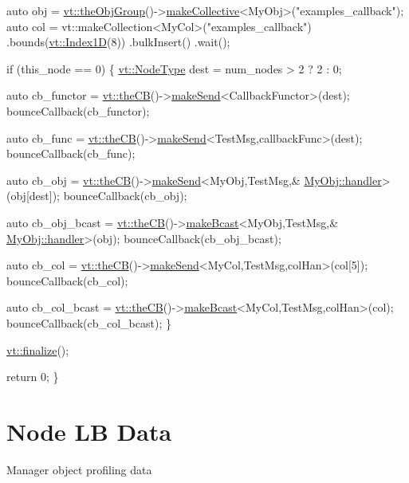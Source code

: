 \begin{DoxyCodeInclude}
  \textcolor{keyword}{auto} obj = \hyperlink{namespacevt_a833f0115b692f578167cbd88e30d39c5}{vt::theObjGroup}()->\hyperlink{structvt_1_1objgroup_1_1_obj_group_manager_a50e0d8498d142a05773ed5a046803b2b}{makeCollective}<MyObj>(\textcolor{stringliteral}{"examples\_callback"});
  \textcolor{keyword}{auto} col = vt::makeCollection<MyCol>(\textcolor{stringliteral}{"examples\_callback"})
    .bounds(\hyperlink{structvt_1_1index_1_1_dense_index_array}{vt::Index1D}(8))
    .bulkInsert()
    .wait();

  \textcolor{keywordflow}{if} (this\_node == 0) \{
    \hyperlink{namespacevt_a866da9d0efc19c0a1ce79e9e492f47e2}{vt::NodeType} dest = num\_nodes > 2 ? 2 : 0;

    \textcolor{keyword}{auto} cb\_functor = \hyperlink{namespacevt_a673b109e94c7bca58313504c83e1da94}{vt::theCB}()->\hyperlink{structvt_1_1pipe_1_1_pipe_manager_a73583be6260418b13ee66e56cdade2da}{makeSend}<CallbackFunctor>(dest);
    bounceCallback(cb\_functor);

    \textcolor{keyword}{auto} cb\_func = \hyperlink{namespacevt_a673b109e94c7bca58313504c83e1da94}{vt::theCB}()->\hyperlink{structvt_1_1pipe_1_1_pipe_manager_a73583be6260418b13ee66e56cdade2da}{makeSend}<TestMsg,callbackFunc>(dest);
    bounceCallback(cb\_func);

    \textcolor{keyword}{auto} cb\_obj = \hyperlink{namespacevt_a673b109e94c7bca58313504c83e1da94}{vt::theCB}()->\hyperlink{structvt_1_1pipe_1_1_pipe_manager_a73583be6260418b13ee66e56cdade2da}{makeSend}<MyObj,TestMsg,&
      \hyperlink{namespacevt_1_1config_a6bd1d6215bda0d8ca02811798399f689a82a0081a94d5c5dfd18b0b3f7eca64b7}{MyObj::handler}>(obj[dest]);
    bounceCallback(cb\_obj);

    \textcolor{keyword}{auto} cb\_obj\_bcast = \hyperlink{namespacevt_a673b109e94c7bca58313504c83e1da94}{vt::theCB}()->\hyperlink{structvt_1_1pipe_1_1_pipe_manager_a2ea6bd5ea3e001662681b1e5a1971e9d}{makeBcast}<MyObj,TestMsg,&
      \hyperlink{namespacevt_1_1config_a6bd1d6215bda0d8ca02811798399f689a82a0081a94d5c5dfd18b0b3f7eca64b7}{MyObj::handler}>(obj);
    bounceCallback(cb\_obj\_bcast);

    \textcolor{keyword}{auto} cb\_col = \hyperlink{namespacevt_a673b109e94c7bca58313504c83e1da94}{vt::theCB}()->\hyperlink{structvt_1_1pipe_1_1_pipe_manager_a73583be6260418b13ee66e56cdade2da}{makeSend}<MyCol,TestMsg,colHan>(col[5]);
    bounceCallback(cb\_col);

    \textcolor{keyword}{auto} cb\_col\_bcast = \hyperlink{namespacevt_a673b109e94c7bca58313504c83e1da94}{vt::theCB}()->\hyperlink{structvt_1_1pipe_1_1_pipe_manager_a2ea6bd5ea3e001662681b1e5a1971e9d}{makeBcast}<MyCol,TestMsg,colHan>(col);
    bounceCallback(cb\_col\_bcast);
  \}

  \hyperlink{namespacevt_a540d90dbd6e97b69f1dcbc9ee9314cff}{vt::finalize}();

  \textcolor{keywordflow}{return} 0;
\}
\end{DoxyCodeInclude}
\hypertarget{node-lb-data}{}\section{Node LB Data}\label{node-lb-data}
Manager object profiling data

